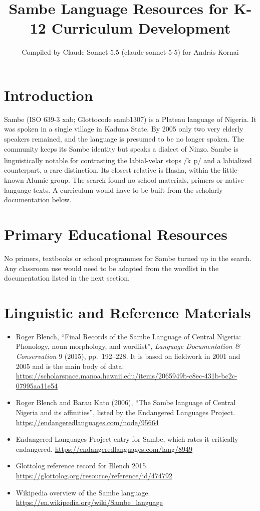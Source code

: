 \documentclass[12pt]{article}
\title{Sambe Language Resources for K-12 Curriculum Development}
\author{Compiled by Claude Sonnet 5.5 (claude-sonnet-5-5) for Andr\'as Kornai}
\date{}
\begin{document}
\maketitle

\section{Introduction}
Sambe (ISO 639-3 xab; Glottocode samb1307) is a Plateau language of Nigeria. It was spoken in a single village in Kaduna State. By 2005 only two very elderly speakers remained, and the language is presumed to be no longer spoken. The community keeps its Sambe identity but speaks a dialect of Ninzo. Sambe is linguistically notable for contrasting the labial-velar stops /k\textsuperscript{\ }p/ and a labialized counterpart, a rare distinction. Its closest relative is Hasha, within the little-known Alumic group. The search found no school materials, primers or native-language texts. A curriculum would have to be built from the scholarly documentation below.

\section{Primary Educational Resources}
No primers, textbooks or school programmes for Sambe turned up in the search. Any classroom use would need to be adapted from the wordlist in the documentation listed in the next section.

\section{Linguistic and Reference Materials}
\begin{itemize}
\item Roger Blench, ``Final Records of the Sambe Language of Central Nigeria: Phonology, noun morphology, and wordlist'', \textit{Language Documentation \& Conservation} 9 (2015), pp.\ 192--228. It is based on fieldwork in 2001 and 2005 and is the main body of data. \url{https://scholarspace.manoa.hawaii.edu/items/2065949b-c8ec-431b-bc2c-07995aa11e54}
\item Roger Blench and Barau Kato (2006), ``The Sambe language of Central Nigeria and its affinities'', listed by the Endangered Languages Project. \url{https://endangeredlanguages.com/node/95664}
\item Endangered Languages Project entry for Sambe, which rates it critically endangered. \url{https://endangeredlanguages.com/lang/8949}
\item Glottolog reference record for Blench 2015. \url{https://glottolog.org/resource/reference/id/474792}
\item Wikipedia overview of the Sambe language. \url{https://en.wikipedia.org/wiki/Sambe_language}
\end{itemize}
\end{document}
